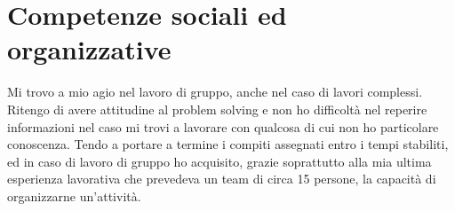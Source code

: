 \section{Competenze sociali ed organizzative}
Mi trovo a mio agio nel lavoro di gruppo, anche nel caso di lavori complessi.\newline
Ritengo di avere attitudine al problem solving e non ho difficoltà nel reperire
informazioni nel caso mi trovi a lavorare con qualcosa di cui non ho particolare conoscenza.\newline
Tendo a portare a termine i compiti assegnati entro i tempi stabiliti, ed in caso
di lavoro di gruppo ho acquisito, grazie soprattutto alla mia ultima esperienza lavorativa
che prevedeva un team di circa 15 persone, la capacit\`a di organizzarne un'attivit\`a.
